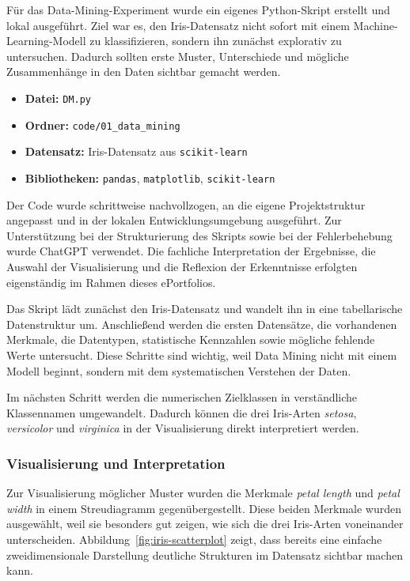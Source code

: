 \documentclass[12pt,a4paper]{article}
\begin{document}
Für das Data-Mining-Experiment wurde ein eigenes Python-Skript erstellt und lokal ausgeführt. Ziel war es, den Iris-Datensatz nicht sofort mit einem Machine-Learning-Modell zu klassifizieren, sondern ihn zunächst explorativ zu untersuchen. Dadurch sollten erste Muster, Unterschiede und mögliche Zusammenhänge in den Daten sichtbar gemacht werden.

\begin{itemize}
\item \textbf{Datei:} \texttt{DM.py}
\item \textbf{Ordner:} \texttt{code/01_data_mining}
\item \textbf{Datensatz:} Iris-Datensatz aus \texttt{scikit-learn}
\item \textbf{Bibliotheken:} \texttt{pandas}, \texttt{matplotlib}, \texttt{scikit-learn}
\end{itemize}

Der Code wurde schrittweise nachvollzogen, an die eigene Projektstruktur angepasst und in der lokalen Entwicklungsumgebung ausgeführt. Zur Unterstützung bei der Strukturierung des Skripts sowie bei der Fehlerbehebung wurde ChatGPT verwendet. Die fachliche Interpretation der Ergebnisse, die Auswahl der Visualisierung und die Reflexion der Erkenntnisse erfolgten eigenständig im Rahmen dieses ePortfolios.

Das Skript lädt zunächst den Iris-Datensatz und wandelt ihn in eine tabellarische Datenstruktur um. Anschließend werden die ersten Datensätze, die vorhandenen Merkmale, die Datentypen, statistische Kennzahlen sowie mögliche fehlende Werte untersucht. Diese Schritte sind wichtig, weil Data Mining nicht mit einem Modell beginnt, sondern mit dem systematischen Verstehen der Daten.

Im nächsten Schritt werden die numerischen Zielklassen in verständliche Klassennamen umgewandelt. Dadurch können die drei Iris-Arten \textit{setosa}, \textit{versicolor} und \textit{virginica} in der Visualisierung direkt interpretiert werden.

\subsubsection*{Visualisierung und Interpretation}

Zur Visualisierung möglicher Muster wurden die Merkmale \textit{petal length} und \textit{petal width} in einem Streudiagramm gegenübergestellt. Diese beiden Merkmale wurden ausgewählt, weil sie besonders gut zeigen, wie sich die drei Iris-Arten voneinander unterscheiden. Abbildung~\ref{fig:iris-scatterplot} zeigt, dass bereits eine einfache zweidimensionale Darstellung deutliche Strukturen im Datensatz sichtbar machen kann.
\end{document}
